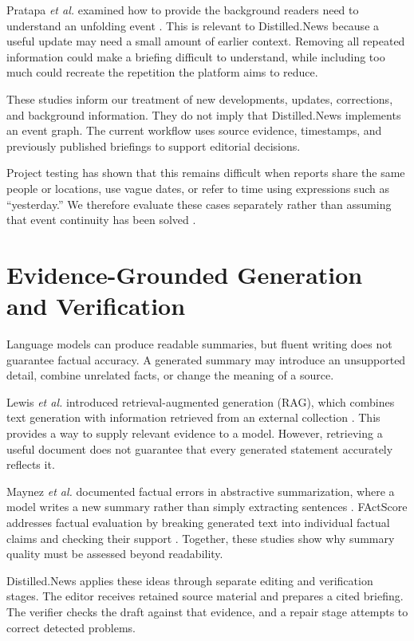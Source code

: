 Pratapa \textit{et al.} examined how to provide the background readers need to understand an unfolding event \cite{pratapa2023}. This is relevant to Distilled.News because a useful update may need a small amount of earlier context. Removing all repeated information could make a briefing difficult to understand, while including too much could recreate the repetition the platform aims to reduce.

These studies inform our treatment of new developments, updates, corrections, and background information. They do not imply that Distilled.News implements an event graph. The current workflow uses source evidence, timestamps, and previously published briefings to support editorial decisions.

Project testing has shown that this remains difficult when reports share the same people or locations, use vague dates, or refer to time using expressions such as ``yesterday.'' We therefore evaluate these cases separately rather than assuming that event continuity has been solved \cite{continuity,v3twenty}.

\section{Evidence-Grounded Generation and Verification}

Language models can produce readable summaries, but fluent writing does not guarantee factual accuracy. A generated summary may introduce an unsupported detail, combine unrelated facts, or change the meaning of a source.

Lewis \textit{et al.} introduced retrieval-augmented generation (RAG), which combines text generation with information retrieved from an external collection \cite{lewis2020}. This provides a way to supply relevant evidence to a model. However, retrieving a useful document does not guarantee that every generated statement accurately reflects it.

Maynez \textit{et al.} documented factual errors in abstractive summarization, where a model writes a new summary rather than simply extracting sentences \cite{maynez2020}. FActScore addresses factual evaluation by breaking generated text into individual factual claims and checking their support \cite{min2023}. Together, these studies show why summary quality must be assessed beyond readability.

Distilled.News applies these ideas through separate editing and verification stages. The editor receives retained source material and prepares a cited briefing. The verifier checks the draft against that evidence, and a repair stage attempts to correct detected problems.

